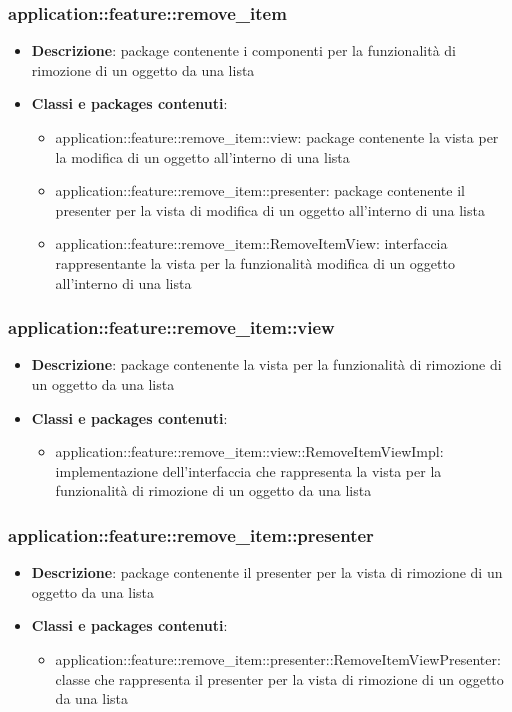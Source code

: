 \subsubsection{application::feature::remove\_item}
\begin{itemize}
	\item \textbf{Descrizione}: package contenente i componenti per la funzionalità di rimozione di un oggetto da una lista
	\item \textbf{Classi e packages contenuti}:
	\begin{itemize}
	\item application::feature::remove\_item::view: package contenente la vista per la modifica di un oggetto all'interno di una lista
	\item application::feature::remove\_item::presenter: package contenente il presenter per la vista di modifica di un oggetto all'interno di una lista
	\item application::feature::remove\_item::RemoveItemView: interfaccia rappresentante la vista per la funzionalità modifica di un oggetto all'interno di una lista
	\end{itemize}
\end{itemize}

\subsubsection{application::feature::remove\_item::view}
\begin{itemize}
	\item \textbf{Descrizione}: package contenente la vista per la funzionalità di rimozione di un oggetto da una lista
	\item \textbf{Classi e packages contenuti}:
	\begin{itemize}
	\item application::feature::remove\_item::view::RemoveItemViewImpl: implementazione dell'interfaccia che rappresenta la vista per la funzionalità di rimozione di un oggetto da una lista
	\end{itemize}
\end{itemize}

\subsubsection{application::feature::remove\_item::presenter}
\begin{itemize}
	\item \textbf{Descrizione}: package contenente il presenter per la vista di rimozione di un oggetto da una lista
	\item \textbf{Classi e packages contenuti}:
	\begin{itemize}
	\item application::feature::remove\_item::presenter::RemoveItemViewPresenter: classe che rappresenta il presenter per la vista di rimozione di un oggetto da una lista
	\end{itemize}
\end{itemize}


